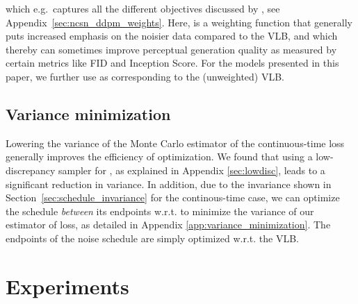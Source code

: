\documentclass{article}
\begin{document}
which e.g.\ captures all the different objectives discussed by \cite{song2020score}, see Appendix~\ref{sec:ncsn_ddpm_weights}. Here,  is a weighting function that generally puts increased emphasis on the noisier data compared to the VLB, and which thereby can sometimes improve perceptual generation quality as measured by certain metrics like FID and Inception Score. For the models presented in this paper, we further use  as corresponding to the (unweighted) VLB. 
















\subsection{Variance minimization}

Lowering the variance of the Monte Carlo estimator of the continuous-time loss generally improves the efficiency of optimization. We found that using a low-discrepancy sampler for , as explained in Appendix \ref{sec:lowdisc}, leads to a significant reduction in variance. In addition, due to the invariance shown in Section~\ref{sec:schedule_invariance} for the continous-time case, we can optimize the schedule \emph{between} its endpoints w.r.t. to minimize the variance of our estimator of loss, as detailed in Appendix \ref{app:variance_minimization}. The endpoints of the noise schedule are simply optimized w.r.t. the VLB. 

\section{Experiments}
\label{sec:experiments}
\end{document}
